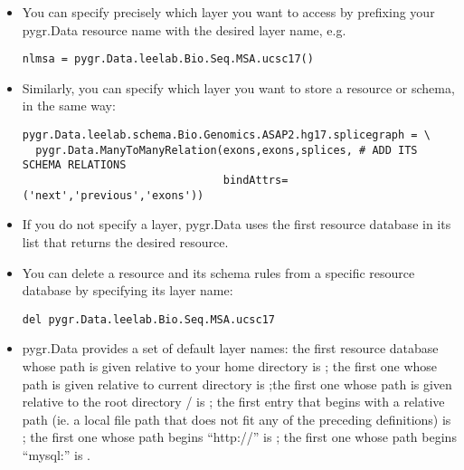 \documentclass{howto}
\begin{document}
\begin{itemize}
\item You can specify precisely which layer you want to access by prefixing
your pygr.Data resource name with the desired layer name, e.g.
\begin{verbatim}
nlmsa = pygr.Data.leelab.Bio.Seq.MSA.ucsc17()
\end{verbatim}

\item Similarly, you can specify which layer you want to store a resource
or schema, in the same way:
\begin{verbatim}
pygr.Data.leelab.schema.Bio.Genomics.ASAP2.hg17.splicegraph = \
  pygr.Data.ManyToManyRelation(exons,exons,splices, # ADD ITS SCHEMA RELATIONS
                               bindAttrs=('next','previous','exons'))
\end{verbatim}

\item If you do not specify a layer, pygr.Data uses the first resource
database in its list that returns the desired resource.

\item You can delete a resource and its schema rules from a specific resource
database by specifying its layer name:
\begin{verbatim}
del pygr.Data.leelab.Bio.Seq.MSA.ucsc17
\end{verbatim}

\item pygr.Data provides a set of default layer names:
the first resource database whose path is given relative to 
your home directory is ; the first one whose path is given
relative to current directory is \code{here};the first one whose path is given
relative to the root directory / is \code{system};
the first entry that begins with a relative path 
(ie. a local file path that does not fit any of the preceding
definitions) is ;
the first one whose path begins ``http://'' is ;
the first one whose path begins ``mysql:'' is .

\end{itemize}
\end{document}
